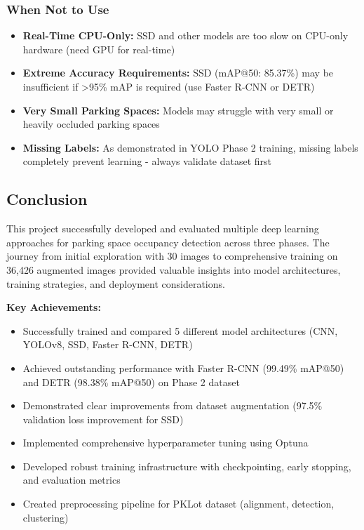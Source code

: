 \documentclass[12pt,a4paper]{article}
\begin{document}
\subsubsection{When Not to Use}

\begin{itemize}
    \item \textbf{Real-Time CPU-Only:} SSD and other models are too slow on CPU-only hardware (need GPU for real-time)
    \item \textbf{Extreme Accuracy Requirements:} SSD (mAP@50: 85.37\%) may be insufficient if >95\% mAP is required (use Faster R-CNN or DETR)
    \item \textbf{Very Small Parking Spaces:} Models may struggle with very small or heavily occluded parking spaces
    \item \textbf{Missing Labels:} As demonstrated in YOLO Phase 2 training, missing labels completely prevent learning - always validate dataset first
\end{itemize}

\subsection{Conclusion}

This project successfully developed and evaluated multiple deep learning approaches for parking space occupancy detection across three phases. The journey from initial exploration with 30 images to comprehensive training on 36,426 augmented images provided valuable insights into model architectures, training strategies, and deployment considerations.

\textbf{Key Achievements:}
\begin{itemize}
    \item Successfully trained and compared 5 different model architectures (CNN, YOLOv8, SSD, Faster R-CNN, DETR)
    \item Achieved outstanding performance with Faster R-CNN (99.49\% mAP@50) and DETR (98.38\% mAP@50) on Phase 2 dataset
    \item Demonstrated clear improvements from dataset augmentation (97.5\% validation loss improvement for SSD)
    \item Implemented comprehensive hyperparameter tuning using Optuna
    \item Developed robust training infrastructure with checkpointing, early stopping, and evaluation metrics
    \item Created preprocessing pipeline for PKLot dataset (alignment, detection, clustering)
\end{itemize}
\end{document}
